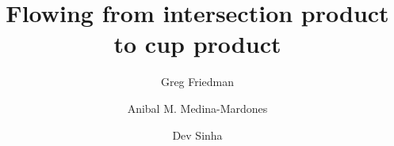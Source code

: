 \documentclass{amsart}
\title{Flowing from intersection product to cup product}
\author[G. Friedman]{Greg Friedman}
\author[A. Medina-Mardones]{Anibal M. Medina-Mardones}
\author[D. Sinha]{Dev Sinha}
\begin{document}
	
	\maketitle
	\sloppy
	\printbibliography
\end{document}
